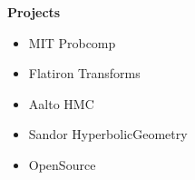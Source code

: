 \noindent \textbf{\Huge Projects}\\[0.3cm]

\begin{itemize}
    \item MIT Probcomp
    \item Flatiron Transforms
    \item Aalto HMC
    \item Sandor HyperbolicGeometry
    \item OpenSource
\end{itemize}